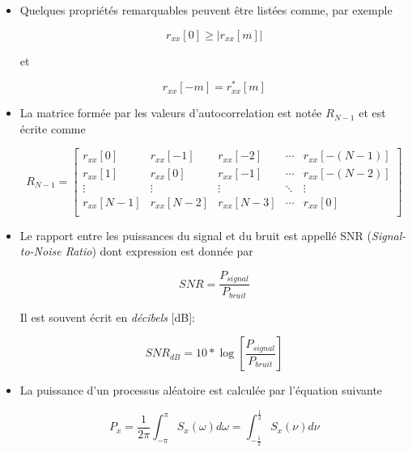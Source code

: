 \documentclass{article}
\begin{document}
\begin{itemize}
\item Quelques propriétés remarquables peuvent être listées comme, par exemple

\[r_{xx}[0] \ge |r_{xx}[m]|\] 

et 

\[r_{xx}[-m] = r_{xx}^*[m]\]

\vspace*{15pt}

\item La matrice formée par les valeurs d'autocorrelation est notée \(R_{N-1}\) et est écrite comme

\begin{equation}
%
    \label{eq:matricecorr}
    R_{N-1}=\begin{bmatrix}
        r_{xx}[0] & r_{xx}[-1] & r_{xx}[-2] & \cdots & r_{xx}[-(N-1)] \\
        r_{xx}[1] & r_{xx}[0] & r_{xx}[-1] & \cdots & r_{xx}[-(N-2)] \\
        \vdots & \vdots & \vdots & \ddots & \vdots \\
        r_{xx}[N-1] & r_{xx}[N-2] & r_{xx}[N-3] & \cdots & r_{xx}[0] \\
    \end{bmatrix}
%
\end{equation}

\vspace*{15pt}

\item Le rapport entre les puissances du signal et du bruit est appellé SNR (\textit{Signal-to-Noise Ratio}) dont expression est donnée par 

\begin{equation}
    SNR = \frac{P_{signal}}{P_{bruit}}
\end{equation}

Il est souvent écrit en \textit{décibels} [dB]:

\begin{equation}
    \label{eq:snr}
    SNR_{dB} = 10* \log \left[ \frac{P_{signal}}{P_{bruit}} \right]
\end{equation}

\item La puissance d'un processus aléatoire est calculée par l'équation suivante

\begin{equation}
    P_x = \frac{1}{2\pi} \int_{-\pi}^{\pi}  S_x (\omega) d\omega = \int_{-\frac{1}{2}}^{\frac{1}{2}}  S_x (\nu) d\nu
\end{equation}


\end{itemize}
\end{document}
